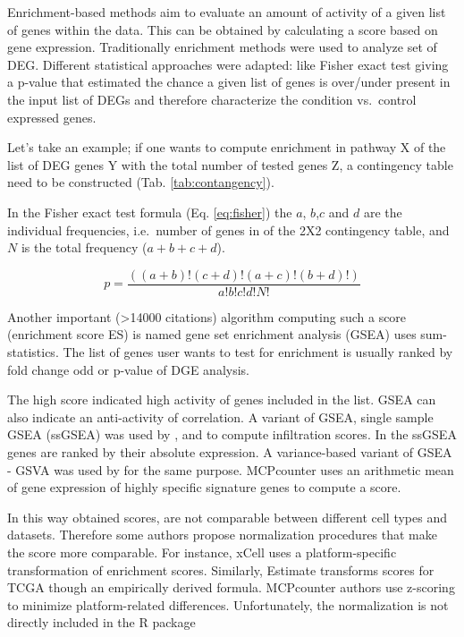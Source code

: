 \documentclass[12pt,]{book}
\theoremstyle{definition}
\theoremstyle{definition}
\theoremstyle{definition}
\theoremstyle{remark}
\begin{document}
Enrichment-based methods aim to evaluate an amount of activity of a
given list of genes within the data. This can be obtained by calculating
a score based on gene expression. Traditionally enrichment methods were
used to analyze set of DEG. Different statistical approaches were
adapted: like Fisher exact test giving a p-value that estimated the
chance a given list of genes is over/under present in the input list of
DEGs and therefore characterize the condition vs.~control expressed
genes.

Let's take an example; if one wants to compute enrichment in pathway X
of the list of DEG genes Y with the total number of tested genes Z, a
contingency table need to be constructed (Tab. \ref{tab:contangency}).

In the Fisher exact test formula (Eq. \eqref{eq:fisher}) the \(a\),
\(b\),\(c\) and \(d\) are the individual frequencies, i.e.~number of
genes in of the 2X2 contingency table, and \(N\) is the total frequency
(\(a + b + c + d\)).

\begin{equation}
p= \frac{( ( a + b ) ! ( c + d ) ! ( a + c ) ! ( b + d ) ! )}{a ! b ! c ! d ! N ! } \label{eq:fisher}
\end{equation}

Another important (\textgreater{}14000 citations) algorithm computing
such a score (enrichment score ES) is named gene set enrichment analysis
(GSEA) \citep{Subramanian2005} uses sum-statistics. The list of genes
user wants to test for enrichment is usually ranked by fold change odd
or p-value of DGE analysis.

The high score indicated high activity of genes included in the list.
GSEA can also indicate an anti-activity of correlation. A variant of
GSEA, single sample GSEA (ssGSEA) \citep{Barbie2009} was used by
\citet{Senbabaoglu2016}, \citet{Yoshihara2013} and \citet{Aran2017} to
compute infiltration scores. In the ssGSEA genes are ranked by their
absolute expression. A variance-based variant of GSEA - GSVA
\citep{Hanzelmann2013} was used by \citet{Tamborero2018} for the same
purpose. MCPcounter \citep{Becht2016} uses an arithmetic mean of gene
expression of highly specific signature genes to compute a score.

In this way obtained scores, are not comparable between different cell
types and datasets. Therefore some authors propose normalization
procedures that make the score more comparable. For instance, xCell uses
a platform-specific transformation of enrichment scores. Similarly,
Estimate transforms scores for TCGA though an empirically derived
formula. MCPcounter authors use z-scoring to minimize platform-related
differences. Unfortunately, the normalization is not directly included
in the R package
\end{document}
